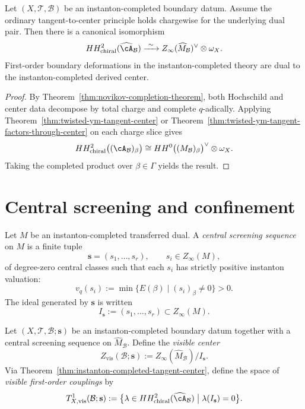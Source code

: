 \begin{theorem}
\label{thm:instanton-completed-tangent-center}
Let $(X,\mathcal T,\mathcal B)$ be an instanton-completed boundary datum.
Assume the ordinary tangent-to-center principle holds chargewise for the underlying dual pair.
Then there is a canonical isomorphism
\[
HH^2_{\mathrm{chiral}}(\widehat{\cA}_{\mathcal B})
\xrightarrow{\ \sim\ }
Z_{\infty}(\widehat M_{\mathcal B})^{\vee}\otimes \omega_X.
\]
First-order boundary deformations in the instanton-completed theory are dual to the
instanton-completed derived center.
\end{theorem}

\begin{proof}
By Theorem~\ref{thm:novikov-completion-theorem}, both Hochschild and center data decompose by total
charge and complete $q$-adically. Applying Theorem~\ref{thm:twisted-ym-tangent-center} or
Theorem~\ref{thm:twisted-ym-tangent-factors-through-center} on each charge slice gives
\[
HH^2_{\mathrm{chiral}}\bigl((\cA_{\mathcal B})_{\beta}\bigr)
\cong HH^0\bigl((M_{\mathcal B})_{\beta}\bigr)^{\vee}\otimes \omega_X.
\]
Taking the completed product over $\beta\in\Gamma$ yields the result.
\end{proof}


\section{Central screening and confinement}
\label{sec:central-screening-confinement}

\begin{definition}
\label{def:central-screening-sequence}
Let $M$ be an instanton-completed transferred dual.
A \emph{central screening sequence} on $M$ is a finite tuple
\[
\mathbf s=(s_1,\dots,s_r),\qquad s_i\in Z_{\infty}(M),
\]
of degree-zero central classes such that each $s_i$ has strictly positive instanton valuation:
\[
v_q(s_i):=\min\{E(\beta)\mid (s_i)_{\beta}\neq 0\}>0.
\]
The ideal generated by $\mathbf s$ is written
\[
I_{\mathbf s}:=(s_1,\dots,s_r)\subset Z_{\infty}(M).
\]
\end{definition}

\begin{definition}
\label{def:visible-center-and-couplings}
Let $(X,\mathcal T,\mathcal B;\mathbf s)$ be an instanton-completed boundary datum together with a central
screening sequence on $\widehat M_{\mathcal B}$.
Define the \emph{visible center}
\[
Z_{\mathrm{vis}}(\mathcal B;\mathbf s)
:=
Z_{\infty}(\widehat M_{\mathcal B})/I_{\mathbf s}.
\]
Via Theorem~\ref{thm:instanton-completed-tangent-center}, define the space of
\emph{visible first-order couplings} by
\[
T^1_{X,\mathrm{vis}}(\mathcal B;\mathbf s)
:=
\bigl\{\lambda\in HH^2_{\mathrm{chiral}}(\widehat{\cA}_{\mathcal B})\;\big|\; \lambda(I_{\mathbf s})=0\bigr\}.
\]
\end{definition}

